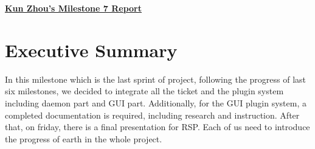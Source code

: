 \begin{center}
{\large\textbf{\underline{{Kun Zhou's Milestone 7 Report}}}}
\end{center}

\section*{Executive Summary}

In this milestone which is the last sprint of project, following the progress of last six milestones, we decided to integrate all the ticket and the plugin system including daemon part and GUI part. Additionally, for the GUI plugin system, a completed documentation is required, including research and instruction. After that, on friday, there is a final presentation for RSP. Each of us need to introduce the progress of earth in the whole project.

